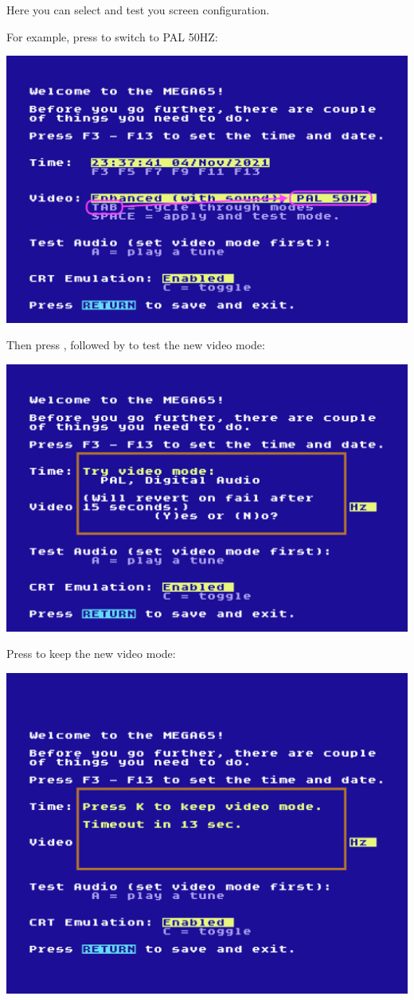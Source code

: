 Here you can select and test you screen configuration.

For example, press  to switch to PAL 50HZ:
\begin{center}
  \includegraphics[width=0.7\linewidth]{images/img011_final_boot_02.png}
\end{center}

Then press , followed by  to test the new video mode:

\begin{center}
  \includegraphics[trim= 15mm 10mm 10mm 15mm,clip,width=0.7\linewidth]{images/img011_final_boot_03.png}
\end{center}

Press  to keep the new video mode:

\begin{center}
  \includegraphics[trim= 20mm 20mm 10mm 25mm,clip,width=0.7\linewidth]{images/img011_final_boot_04.png}
\end{center}

